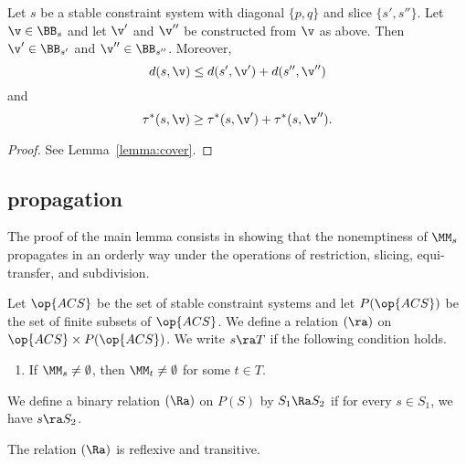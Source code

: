 \begin{lemma}\label{lemma:cover2}
Let $s$ be a stable constraint system with diagonal $\{p,q\}$ and slice
 $\{s',s''\}$. 
Let $\v\in \BB_s$ and let $\v'$ and $\v''$ be constructed from $\v$ as above.
Then  $\v'\in \BB_{s'}$ and $\v''\in \BB_{s''}$.
Moreover,
\begin{equation}
d(s,\v) \le d(s',\v') + d(s'',\v'')
\end{equation}
and
\begin{equation}
\tau^*(s,\v)\ge \tau^*(s,\v')+\tau^*(s,\v'').
\end{equation}
\end{lemma}

\begin{proof} See Lemma~\ref{lemma:cover}.
\end{proof}

\subsection{propagation}

The proof of the main lemma consists in showing that the nonemptiness
of $\MM_s$ propagates in an orderly way under the operations of
restriction, slicing, equi-transfer, and subdivision.

\begin{definition}[$\ra$~$\Ra$] 
Let $\op{ACS}$ be the set of stable constraint systems
and let $P(\op{ACS})$ be the set of finite subsets of $\op{ACS}$. 
 We define a relation $(\ra)$ on $\op{ACS}\times P(\op{ACS})$.
We write $s\ra T$ if the following condition holds.
\begin{enumerate}
\item If $\MM_s\ne\emptyset$, then 
$\MM_t\ne\emptyset$ for some $t\in T$.
\end{enumerate}
We define a binary relation $(\Ra)$ on $P(S)$ by
$S_1\Ra S_2$ if for every $s\in S_1$, we have $s\ra S_2$.
\end{definition}

\begin{lemma}
The relation $(\Ra)$  is reflexive and transitive.
\end{lemma}

